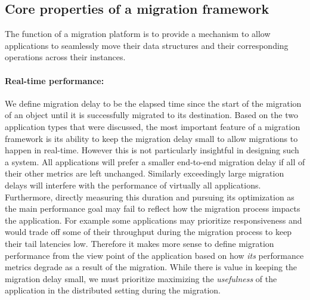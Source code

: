 \subsection{Core properties of a migration framework}
\label{subsec:coreprops}

The function of a migration platform is to provide a mechanism to allow
applications to seamlessly move their data structures and their
corresponding operations across their instances.

\paragraph{Real-time performance:}
We define migration delay to be the elapsed time since the start of the
migration of an object until it is successfully migrated to its
destination. Based on the two application types that were discussed,
the most
important feature of a migration framework is its ability to keep the
migration delay small to allow migrations to happen in real-time.
However this is not particularly insightful in designing such a system.
All applications will prefer a smaller end-to-end migration delay
if all of their other metrics are left unchanged. Similarly exceedingly
    large migration delays will interfere with the performance of
    virtually all applications. Furthermore, directly measuring this
    duration and pursuing its optimization as the main performance goal
    may fail to reflect how the migration process impacts the application.
    For example some applications may prioritize responsiveness and
    would trade off
    some of their throughput during the migration process to keep their
    tail latencies low.  Therefore it makes more sense to define migration
    performance from the view point of the application based on how
    \emph{its} performance metrics degrade as a result of the migration.
    While there is value in keeping the migration delay small, we must
    prioritize maximizing the \emph{usefulness} of the application in
    the distributed setting during the migration.

